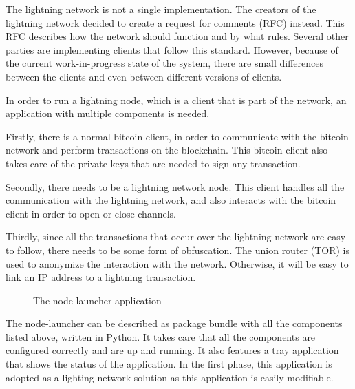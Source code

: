The lightning network is not a single implementation. The creators of the lightning network decided to create a request for comments (RFC) instead. This RFC describes how the network should function and by what rules. Several other parties are implementing clients that follow this standard. However, because of the current work-in-progress state of the system, there are small differences between the clients and even between different versions of clients. 

In order to run a lightning node, which is a client that is part of the network, an application with multiple components is needed. 

Firstly, there is a normal bitcoin client, in order to communicate with the bitcoin network and perform transactions on the blockchain. This bitcoin client also takes care of the private keys that are needed to sign any transaction.

Secondly, there needs to be a lightning network node. This client handles all the communication with the lightning network, and also interacts with the bitcoin client in order to open or close channels. 

Thirdly, since all the transactions that occur over the lightning network are easy to follow, there needs to be some form of obfuscation. The union router (TOR) is used to anonymize the interaction with the network. Otherwise, it will be easy to link an IP address to a lightning transaction.


\begin{figure}[h!]
  \setlength{\fboxsep}{0pt}%
  \center
  \caption{The node-launcher application}
\end{figure}

The node-launcher can be described as package bundle with all the components listed above, written in Python. It takes care that all the components are configured correctly and are up and running. It also features a tray application that shows the status of the application. In the first phase, this application is adopted as a lighting network solution as this application is easily modifiable.


